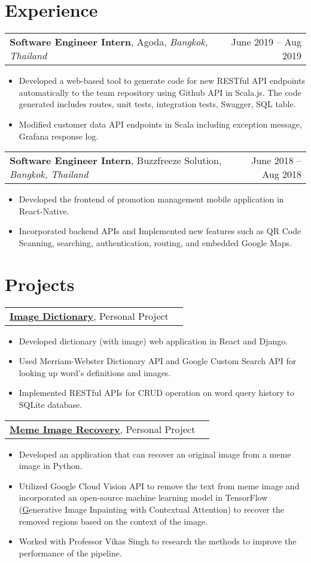 \documentclass[letterpaper,11pt]{article}
\makeatletter
\newcommand{\exptitle}[4]{
  \vspace{7pt}
  \begin{tabular*}{1.00\textwidth}[t]{l@{\extracolsep{\fill}}r}
    \textbf{#1}, #2, \textit{#3} & #4 \\
  \end{tabular*}\vspace{-5pt}
}
\newcommand{\projtitle}[2]{
  \vspace{7pt}
  \begin{tabular*}{1.00\textwidth}[t]{l@{\extracolsep{\fill}}r}
    \textbf{#1}, #2 \\
  \end{tabular*}\vspace{-5pt}
}
\newcommand{\expstart}{\begin{itemize}[leftmargin=5mm]}
\newcommand{\expend}{\end{itemize}\vspace{-5pt}}
\newcommand{\expitem}[1]{\item\small{{#1 \vspace{-5pt}}}}
\makeatother
\begin{document}
\section{Experience}
 \vspace{-6pt}
  \exptitle{Software Engineer Intern}{Agoda}{Bangkok, Thailand}{June 2019 – Aug 2019}
  \expstart
    \expitem{Developed a web-based tool to generate code for new RESTful API endpoints automatically to the team repository using Github API in Scala.js. The code generated includes routes, unit tests, integration tests, Swagger, SQL table. }
    \expitem{Modified customer data API endpoints in Scala including exception message, Grafana response log. }
  \expend
  
  \exptitle{Software Engineer Intern}{Buzzfreeze Solution}{Bangkok, Thailand}{June 2018 – Aug 2018}
  \expstart
    \expitem{Developed the frontend of promotion management mobile application in React-Native. }
    \expitem{Incorporated backend APIs and Implemented new features such as QR Code Scanning, searching, authentication, routing, and embedded Google Maps. }
  \expend

\section{Projects}
  \vspace{-6pt}
  \projtitle{\href{https://github.com/newsatit/image-dictionary}{Image Dictionary}}{Personal Project}
  \expstart
    \expitem{Developed dictionary (with image) web application in React and Django.}
    \expitem{Used Merriam-Webster Dictionary API and Google Custom Search API for looking up word's definitions and images. }
    \expitem{Implemented RESTful APIs for CRUD operation on word query history to SQLite database.}
  \expend
 
  \projtitle{\href{https://github.com/newsatit/meme_image_recovery}{Meme Image Recovery}}{Personal Project}
  \expstart
    \expitem{Developed an application that can recover an original image from a meme image in Python.}
    \expitem{Utilized Google Cloud Vision API  to remove the text from meme image and incorporated an open-source machine learning model in TensorFlow (\href{https://github.com/JiahuiYu/generative_inpainting}Generative Image Inpainting with Contextual Attention) to recover the removed regions based on the context of the image.}
    \expitem{Worked with Professor Vikas Singh to research the methods to improve the performance of the pipeline.}
  \expend
  
\end{document}
